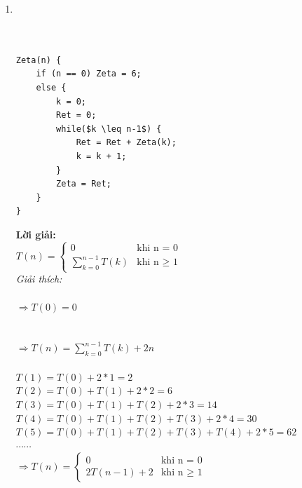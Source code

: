 \documentclass[12pt, letterpaper]{article}
\begin{document}
\begin{enumerate}
    \item 
     \\
     \\ 
     \\
    \begin{lstlisting}
Zeta(n) {
    if (n == 0) Zeta = 6;
    else {
        k = 0;
        Ret = 0;
        while($k \leq n-1$) {
            Ret = Ret + Zeta(k);
            k = k + 1;
        }
        Zeta = Ret;
    }
}
    \end{lstlisting}
    \textbf{Lời giải:} \\
    $T(n) =
    \begin{cases}
        0 & \text{khi n = 0} \\
        \sum_{k=0}^{n-1} T(k) & \text{khi n $\geq$ 1}
    \end{cases}$ \\
    \textit{Giải thích:} \\
     \\
    $\Rightarrow T(0) = 0$ \\
     \\
     \\
    $\Rightarrow T(n) = \sum_{k=0}^{n-1} T(k) + 2n$ \\

     \\
    $T(1) = T(0) + 2*1 = 2$ \\
    $T(2) = T(0) + T(1) + 2*2 = 6$ \\
    $T(3) = T(0) + T(1) + T(2) + 2*3 = 14$ \\
    $T(4) = T(0) + T(1) + T(2) + T(3) + 2*4 = 30$ \\
    $T(5) = T(0) + T(1) + T(2) + T(3) + T(4) + 2*5 = 62$ \\
    $\cdots \cdots$ \\
    $\Rightarrow T(n) =
    \begin{cases}
        0 & \text{khi n = 0} \\
        2T(n-1) + 2 & \text{khi n $\geq$ 1}
    \end{cases}$ \\ 


\end{enumerate}
\end{document}
